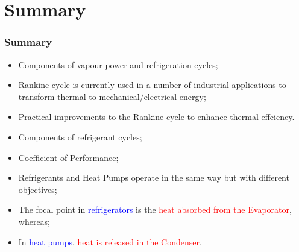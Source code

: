 \documentclass[10pt,compress]{beamer}
\begin{document}
\begin{frame}
\begin{columns}
\begin{column}[c]{0.55\linewidth}
\begin{figure}
\begin{center}
       \vspace{-.5cm}
     \end{center}
    \end{figure}  
   \end{column}  
  \end{columns}
\end{frame}



\section{Summary}
\begin{frame}
 \frametitle{Summary}
  \begin{itemize}
   \item <1-> Components of vapour power and refrigeration cycles;
   \item <3-> Rankine cycle is currently used in a number of industrial applications to transform thermal to mechanical/electrical energy;
   \item <4-> Practical improvements to the Rankine cycle to enhance thermal effciency.
   \item <5-> Components of refrigerant cycles;
   \item <6-> Coefficient of Performance;
   \item <7-> Refrigerants and Heat Pumps operate in the same way but with different objectives;
   \item <8-> The focal point in \textcolor{blue}{refrigerators} is the \textcolor{red}{heat absorbed from the Evaporator}, whereas;
   \item <9-> In \textcolor{blue}{heat pumps}, \textcolor{red}{heat is released in the Condenser}.
  \end{itemize}
\end{frame}
\end{document}
